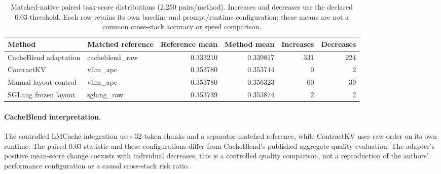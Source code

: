
\begin{table}[t]
\centering\small
\caption{Matched-native paired task-score distributions (2,250 pairs/method). Increases and decreases use the declared 0.03 threshold. Each row retains its own baseline and prompt/runtime configuration; these means are not a common cross-stack accuracy or speed comparison.}
\label{tab:s-native-quality}
\begin{tabular}{@{}lP{3.1cm}rrrr@{}}
\toprule
Method & Matched reference & Reference mean & Method mean & Increases & Decreases\\
\midrule
CacheBlend adaptation & cacheblend\_raw & 0.333210 & 0.339817 & 331 & 224\\
ContractKV & vllm\_apc & 0.353780 & 0.353744 & 0 & 2\\
Manual layout control & vllm\_apc & 0.353780 & 0.356323 & 60 & 39\\
SGLang frozen layout & sglang\_raw & 0.353739 & 0.353874 & 2 & 2\\
\bottomrule
\end{tabular}
\end{table}

\paragraph{CacheBlend interpretation.} The controlled LMCache integration uses 32-token chunks and a separator-matched reference, while ContractKV uses raw order on its own runtime. The paired 0.03 statistic and these configurations differ from CacheBlend's published aggregate-quality evaluation. The adapter's positive mean-score change coexists with individual decreases; this is a controlled quality comparison, not a reproduction of the authors' performance configuration or a causal cross-stack risk ratio.
